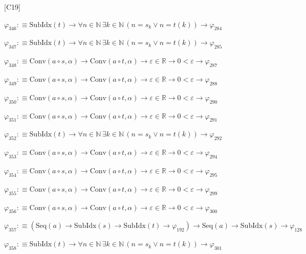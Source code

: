 \begin{fullproof}{[C19]}
\begin{abbrevlist}
\item $\varphi_{346} :\equiv \mathrm{SubIdx}(t) \to \forall n \in \mathbb{N}\,\exists k \in \mathbb{N}\,(n = s_{k} \lor n = t(k)) \to \varphi_{284}$
\item $\varphi_{347} :\equiv \mathrm{SubIdx}(t) \to \forall n \in \mathbb{N}\,\exists k \in \mathbb{N}\,(n = s_{k} \lor n = t(k)) \to \varphi_{285}$
\item $\varphi_{348} :\equiv \mathrm{Conv}(a \circ s,\alpha) \to \mathrm{Conv}(a \circ t,\alpha) \to \varepsilon \in \mathbb{R} \to 0 < \varepsilon \to \varphi_{287}$
\item $\varphi_{349} :\equiv \mathrm{Conv}(a \circ s,\alpha) \to \mathrm{Conv}(a \circ t,\alpha) \to \varepsilon \in \mathbb{R} \to 0 < \varepsilon \to \varphi_{288}$
\item $\varphi_{350} :\equiv \mathrm{Conv}(a \circ s,\alpha) \to \mathrm{Conv}(a \circ t,\alpha) \to \varepsilon \in \mathbb{R} \to 0 < \varepsilon \to \varphi_{290}$
\item $\varphi_{351} :\equiv \mathrm{Conv}(a \circ s,\alpha) \to \mathrm{Conv}(a \circ t,\alpha) \to \varepsilon \in \mathbb{R} \to 0 < \varepsilon \to \varphi_{291}$
\item $\varphi_{352} :\equiv \mathrm{SubIdx}(t) \to \forall n \in \mathbb{N}\,\exists k \in \mathbb{N}\,(n = s_{k} \lor n = t(k)) \to \varphi_{292}$
\item $\varphi_{353} :\equiv \mathrm{Conv}(a \circ s,\alpha) \to \mathrm{Conv}(a \circ t,\alpha) \to \varepsilon \in \mathbb{R} \to 0 < \varepsilon \to \varphi_{294}$
\item $\varphi_{354} :\equiv \mathrm{Conv}(a \circ s,\alpha) \to \mathrm{Conv}(a \circ t,\alpha) \to \varepsilon \in \mathbb{R} \to 0 < \varepsilon \to \varphi_{295}$
\item $\varphi_{355} :\equiv \mathrm{Conv}(a \circ s,\alpha) \to \mathrm{Conv}(a \circ t,\alpha) \to \varepsilon \in \mathbb{R} \to 0 < \varepsilon \to \varphi_{299}$
\item $\varphi_{356} :\equiv \mathrm{Conv}(a \circ s,\alpha) \to \mathrm{Conv}(a \circ t,\alpha) \to \varepsilon \in \mathbb{R} \to 0 < \varepsilon \to \varphi_{300}$
\item $\varphi_{357} :\equiv (\mathrm{Seq}(a) \to \mathrm{SubIdx}(s) \to \mathrm{SubIdx}(t) \to \varphi_{192}) \to \mathrm{Seq}(a) \to \mathrm{SubIdx}(s) \to \varphi_{128}$
\item $\varphi_{358} :\equiv \mathrm{SubIdx}(t) \to \forall n \in \mathbb{N}\,\exists k \in \mathbb{N}\,(n = s_{k} \lor n = t(k)) \to \varphi_{301}$

\end{abbrevlist}
\end{fullproof}
